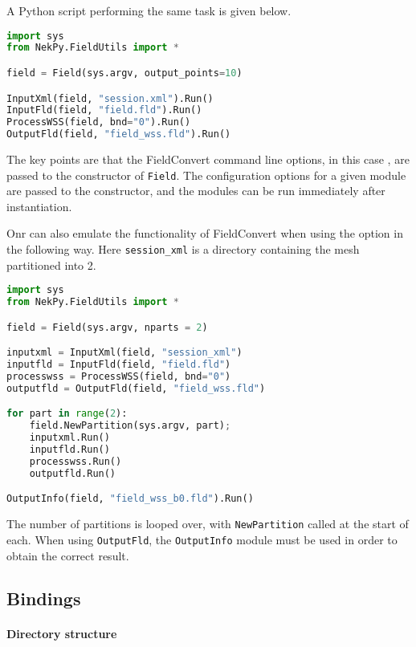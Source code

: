 A Python script performing the same task is given below.

\begin{lstlisting}[style=C++Style, language=Python]
import sys
from NekPy.FieldUtils import *

field = Field(sys.argv, output_points=10)

InputXml(field, "session.xml").Run()
InputFld(field, "field.fld").Run()
ProcessWSS(field, bnd="0").Run()
OutputFld(field, "field_wss.fld").Run()
\end{lstlisting}

The key points are that the FieldConvert command line options, in this case , are passed to the constructor of \verb+Field+. The configuration options for a given module are passed to the constructor, and the modules can be run immediately after instantiation.


Onr can also emulate the functionality of FieldConvert when using the  option in the following way. Here \verb+session_xml+ is a directory containing the mesh partitioned into 2.

\begin{lstlisting}[style=C++Style, language=Python]
import sys
from NekPy.FieldUtils import *

field = Field(sys.argv, nparts = 2)

inputxml = InputXml(field, "session_xml")
inputfld = InputFld(field, "field.fld")
processwss = ProcessWSS(field, bnd="0")
outputfld = OutputFld(field, "field_wss.fld")

for part in range(2):
	field.NewPartition(sys.argv, part);
	inputxml.Run()
	inputfld.Run()
	processwss.Run()
	outputfld.Run()

OutputInfo(field, "field_wss_b0.fld").Run()
\end{lstlisting}


The number of partitions is looped over, with \verb+NewPartition+ called at the start of each. When using \verb+OutputFld+, the \verb+OutputInfo+ module must be used in order to obtain the correct result.

\subsection{Bindings}

\paragraph{Directory structure}

